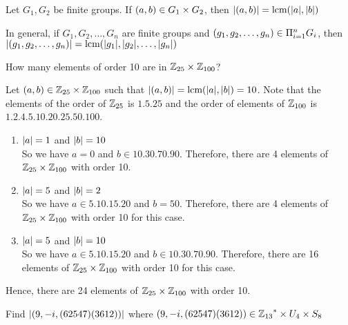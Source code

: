 \begin{theorem}
    Let $G_1, G_2$ be finite groups. If $\qty(a, b) \in G_1 \times G_2$, then $\qty|\qty(a ,b)| = \text{lcm} \qty(\qty|a|, \qty|b|)$
\end{theorem}

\begin{remark}
    In general, if $G_1, G_2,\ldots, G_n$ are finite groups and $\qty(g_1, g_2, \ldots, g_n) \in \Pi_{i = 1}^{n} G_i$, then $\qty|\qty(g_1, g_2, \ldots, g_n)| = \text{lcm}\qty(\qty|g_1|, \qty|g_2|, \ldots, \qty|g_n|)$
\end{remark}

\begin{example}
    How many elements of order 10 are in $\mathbb{Z}_{25} \times \mathbb{Z}_{100}$?
\end{example}

\begin{solution}
    Let $\qty(a, b) \in \mathbb{Z}_{25} \times \mathbb{Z}_{100}$ such that $\qty|\qty(a, b)| = \text{lcm} \qty(\qty|a|, \qty|b|) =10$. Note that the elements of the order of $\mathbb{Z}_{25}$ is $\qty{1, 5, 25}$ and the order of elements of $\mathbb{Z}_{100}$ is $\qty{1, 2, 4, 5, 10, 20, 25, 50, 100}$. 
    
    \begin{myspace}
        \begin{enumerate}[label=\textbf{Case \arabic*:}]
            \item $\qty|a| = 1$ and $\qty|b| = 10$ \\
            So we have $a=0$ and $b \in \qty{10, 30, 70, 90}$. Therefore, there are 4 elements of $\mathbb{Z}_{25} \times \mathbb{Z}_{100}$ with order 10.
            \item $\qty|a| = 5$ and $\qty|b| = 2$ \\
            So we have $a \in \qty{5, 10, 15, 20}$ and $b = 50$. Therefore, there are 4 elements of $\mathbb{Z}_{25} \times \mathbb{Z}_{100}$ with order 10 for this case. 
            \item $\qty|a| = 5$ and $\qty|b| = 10$ \\
            So we have $a \in \qty{5, 10, 15, 20}$ and $b \in \qty{10, 30, 70, 90}$. Therefore, there are 16 elements of $\mathbb{Z}_{25} \times \mathbb{Z}_{100}$ with order 10 for this case.
        \end{enumerate}
        Hence, there are 24 elements of  $\mathbb{Z}_{25} \times \mathbb{Z}_{100}$ with order 10.
    \end{myspace}
\end{solution}

\begin{exercise}
    Find $\qty|\qty(9, -i, \qty(62547)\qty(3612))|$ where $\qty(9, -i, \qty(62547)\qty(3612)) \in {\mathbb{Z}_{13}}^{\ast} \times U_4 \times S_8$
\end{exercise}

